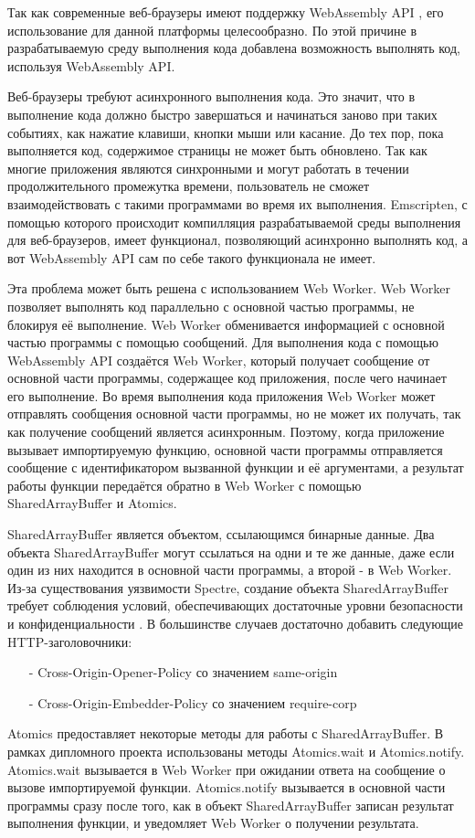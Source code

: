 
Так как современные веб-браузеры имеют поддержку WebAssembly API \cite{WasmBrowserSupport}, его использование для данной платформы целесообразно.
По этой причине в разрабатываемую среду выполнения кода добавлена возможность выполнять код, используя WebAssembly API.

Веб-браузеры требуют асинхронного выполнения кода. 
Это значит, что в выполнение кода должно быстро завершаться и начинаться заново при таких событиях, как нажатие клавиши, кнопки мыши или касание.
До тех пор, пока выполняется код, содержимое страницы не может быть обновлено.
Так как многие приложения являются синхронными и могут работать в течении продолжительного промежутка времени, пользователь не сможет взаимодействовать с такими программами во время их выполнения.
Emscripten, с помощью которого происходит компилляция разрабатываемой среды выполнения для веб-браузеров, имеет функционал, позволяющий асинхронно выполнять код, а вот WebAssembly API сам по себе такого функционала не имеет.

Эта проблема может быть решена с использованием Web Worker.
Web Worker позволяет выполнять код параллельно с основной частью программы, не блокируя её выполнение.
Web Worker обменивается информацией с основной частью программы с помощью сообщений. \cite{WebWorkerMessages}
Для выполнения кода с помощью WebAssembly API создаётся Web Worker, который получает сообщение от основной части программы, содержащее код приложения, после чего начинает его выполнение.
Во время выполнения кода приложения Web Worker может отправлять сообщения основной части программы, но не может их получать, так как получение сообщений является асинхронным.
Поэтому, когда приложение вызывает импортируемую функцию, основной части программы отправляется сообщение с идентификатором вызванной функции и её аргументами, а результат работы функции передаётся обратно в Web Worker с помощью SharedArrayBuffer и Atomics.

SharedArrayBuffer является объектом, ссылающимся бинарные данные.
Два объекта SharedArrayBuffer могут ссылаться на одни и те же данные, даже если один из них находится в основной части программы, а второй - в Web Worker.
Из-за существования уязвимости Spectre, создание объекта SharedArrayBuffer требует соблюдения условий, обеспечивающих достаточные уровни безопасности и конфиденциальности \cite{SharedArrayBuffer}. В большинстве случаев достаточно добавить следующие HTTP-заголовочники:
\begin{itemize}
    \item[-] Cross-Origin-Opener-Policy со значением same-origin 
    \item[-] Cross-Origin-Embedder-Policy со значением require-corp
\end{itemize}

Atomics предоставляет некоторые методы для работы с SharedArrayBuffer.
В рамках дипломного проекта использованы методы Atomics.wait и Atomics.notify.
Atomics.wait вызывается в Web Worker при ожидании ответа на сообщение о вызове импортируемой функции.
Atomics.notify вызывается в основной части программы сразу после того, как в объект SharedArrayBuffer записан результат выполнения функции, и уведомляет Web Worker о получении результата.

